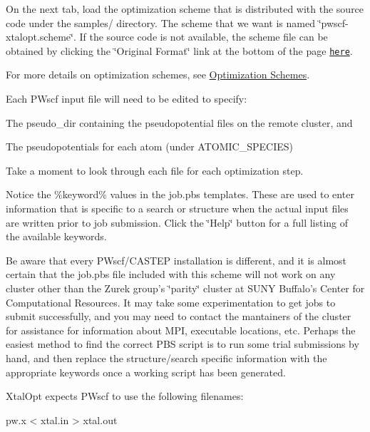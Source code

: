 On the next tab, load the optimization scheme that is distributed with the source code under the samples/ directory. The scheme that we want is named \char`\"{}pwscf-\/xtalopt.\-scheme\char`\"{}. If the source code is not available, the scheme file can be obtained by clicking the \char`\"{}\-Original Format\char`\"{} link at the bottom of the page \href{http://xtalopt.openmolecules.net/wiki/index.fcgi/browser/samples/pwscf-xtalopt.scheme}{\tt here}.

For more details on optimization schemes, see \hyperlink{optschemes}{Optimization Schemes}.

Each P\-Wscf input file will need to be edited to specify\-:
\begin{DoxyEnumerate}
\item The pseudo\-\_\-dir containing the pseudopotential files on the remote cluster, and
\item The pseudopotentials for each atom (under A\-T\-O\-M\-I\-C\-\_\-\-S\-P\-E\-C\-I\-E\-S)
\end{DoxyEnumerate}

Take a moment to look through each file for each optimization step.

Notice the \%keyword\% values in the job.\-pbs templates. These are used to enter information that is specific to a search or structure when the actual input files are written prior to job submission. Click the \char`\"{}\-Help\char`\"{} button for a full listing of the available keywords.

Be aware that every P\-Wscf/\-C\-A\-S\-T\-E\-P installation is different, and it is almost certain that the job.\-pbs file included with this scheme will not work on any cluster other than the Zurek group's \char`\"{}parity\char`\"{} cluster at S\-U\-N\-Y Buffalo's Center for Computational Resources. It may take some experimentation to get jobs to submit successfully, and you may need to contact the mantainers of the cluster for assistance for information about M\-P\-I, executable locations, etc. Perhaps the easiest method to find the correct P\-B\-S script is to run some trial submissions by hand, and then replace the structure/search specific information with the appropriate keywords once a working script has been generated.

Xtal\-Opt expects P\-Wscf to use the following filenames\-:


\begin{DoxyCode}
pw.x < xtal.in > xtal.out
\end{DoxyCode}


